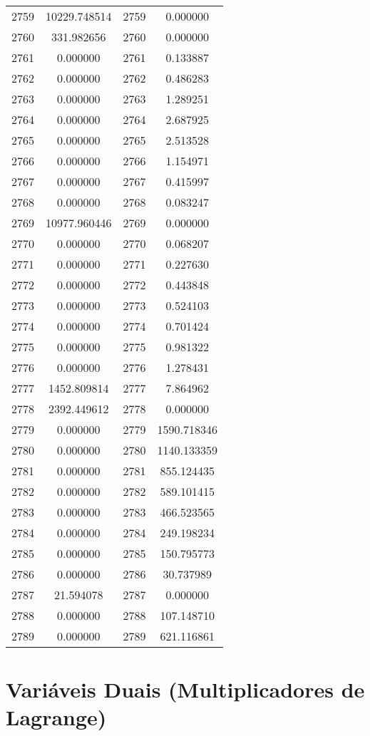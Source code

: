 \documentclass[12pt]{article}
\begin{document}
\begin{longtable}{@{}cccc@{}}
2759 & 10229.748514 & 2759 & 0.000000 \\
2760 & 331.982656 & 2760 & 0.000000 \\
2761 & 0.000000 & 2761 & 0.133887 \\
2762 & 0.000000 & 2762 & 0.486283 \\
2763 & 0.000000 & 2763 & 1.289251 \\
2764 & 0.000000 & 2764 & 2.687925 \\
2765 & 0.000000 & 2765 & 2.513528 \\
2766 & 0.000000 & 2766 & 1.154971 \\
2767 & 0.000000 & 2767 & 0.415997 \\
2768 & 0.000000 & 2768 & 0.083247 \\
2769 & 10977.960446 & 2769 & 0.000000 \\
2770 & 0.000000 & 2770 & 0.068207 \\
2771 & 0.000000 & 2771 & 0.227630 \\
2772 & 0.000000 & 2772 & 0.443848 \\
2773 & 0.000000 & 2773 & 0.524103 \\
2774 & 0.000000 & 2774 & 0.701424 \\
2775 & 0.000000 & 2775 & 0.981322 \\
2776 & 0.000000 & 2776 & 1.278431 \\
2777 & 1452.809814 & 2777 & 7.864962 \\
2778 & 2392.449612 & 2778 & 0.000000 \\
2779 & 0.000000 & 2779 & 1590.718346 \\
2780 & 0.000000 & 2780 & 1140.133359 \\
2781 & 0.000000 & 2781 & 855.124435 \\
2782 & 0.000000 & 2782 & 589.101415 \\
2783 & 0.000000 & 2783 & 466.523565 \\
2784 & 0.000000 & 2784 & 249.198234 \\
2785 & 0.000000 & 2785 & 150.795773 \\
2786 & 0.000000 & 2786 & 30.737989 \\
2787 & 21.594078 & 2787 & 0.000000 \\
2788 & 0.000000 & 2788 & 107.148710 \\
2789 & 0.000000 & 2789 & 621.116861 \\

\end{longtable}

\section{Variáveis Duais (Multiplicadores de Lagrange)}
\end{document}
